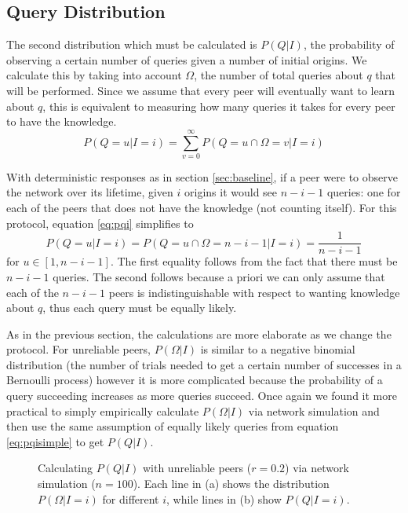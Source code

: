 \documentclass{article}
\newcommand{\eqnref}[1]{equation \eqref{eq:#1}}
\newcommand{\secref}[1]{section \ref{sec:#1}}
\begin{document}
\subsection{Query Distribution}\label{sec:qgiveni}

The second distribution which must be calculated is $P(Q|I)$, the probability of
observing a certain number of queries given a number of initial origins. We
calculate this by taking into account $\Omega$, the number of total queries
about $q$ that will be performed. Since we assume that every peer will
eventually want to learn about $q$, this is equivalent to measuring how many
queries it takes for every peer to have the knowledge.
\begin{equation}\label{eq:pqi}
	P(Q=u|I=i)=\sum_{v=0}^\infty P(Q=u\cap\Omega=v|I=i)
\end{equation}

With deterministic responses as in \secref{baseline}, if a peer were to
observe the network over its lifetime, given $i$ origins it would see $n-i-1$
queries: one for each of the peers that does not have the knowledge (not
counting itself). For this protocol, \eqnref{pqi} simplifies to
\begin{equation}\label{eq:pqisimple}
	P(Q=u|I=i)=P(Q=u\cap\Omega=n-i-1|I=i)=\frac{1}{n-i-1}
\end{equation}
for $u\in[1,n-i-1]$. The first equality follows from the fact that there must be
$n-i-1$ queries. The second follows because a priori we can only assume that
each of the $n-i-1$ peers is indistinguishable with respect to wanting knowledge
about $q$, thus each query must be equally likely.

As in the previous section, the calculations are more elaborate as we change the
protocol. For unreliable peers, $P(\Omega|I)$ is similar to a negative binomial
distribution (the number of trials needed to get a certain number of successes
in a Bernoulli process) however it is more complicated because the probability
of a query succeeding increases as more queries succeed. Once again we found it
more practical to simply empirically calculate $P(\Omega|I)$ via network
simulation and then use the same assumption of equally likely queries from
\eqnref{pqisimple} to get $P(Q|I)$.


\begin{figure}%
    \centering
	\caption{Calculating $P(Q|I)$ with unreliable peers ($r=0.2$) via network
	simulation ($n=100$). Each line in (a) shows the distribution
	$P(\Omega|I=i)$ for different $i$, while lines in (b) show $P(Q|I=i)$.}
    \label{fig:unrelqueries}%
\end{figure}
\end{document}
